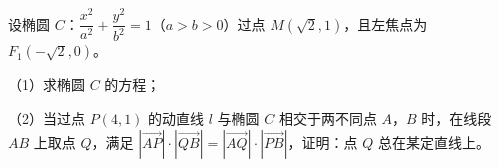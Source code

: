 \begin{question}
设椭圆 $C$：$\dfrac{x^2}{a^2}+\dfrac{y^2}{b^2}=1$（$a>b>0$）过点 $M(\sqrt2,1)$，且左焦点为 $F_1(-\sqrt2,0)$。

（1）求椭圆 $C$ 的方程；

（2）当过点 $P(4,1)$ 的动直线 $l$ 与椭圆 $C$ 相交于两不同点 $A$，$B$ 时，在线段 $AB$ 上取点 $Q$，满足 $\left|\overrightarrow{AP}\right|\cdot\left|\overrightarrow{QB}\right|=\left|\overrightarrow{AQ}\right|\cdot\left|\overrightarrow{PB}\right|$，证明：点 $Q$ 总在某定直线上。

\end{question}